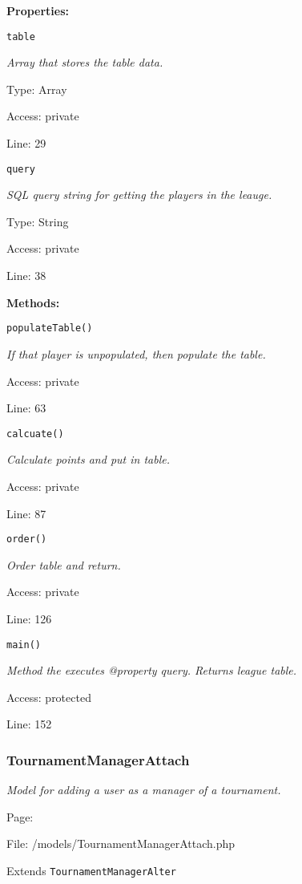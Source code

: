 \textbf{Properties:}

\texttt{table}

{\scriptsize
\textit{Array that stores the table data.}

Type: Array

Access: private

Line: 29

}
\texttt{query}

{\scriptsize
\textit{SQL query string for getting the players in the leauge.}

Type: String

Access: private

Line: 38

}
\textbf{Methods:}

\texttt{populateTable()}

{\scriptsize
\textit{If that player is unpopulated, then populate the table.}

Access: private

Line: 63

}

\texttt{calcuate()}

{\scriptsize
\textit{Calculate points and put in table.}

Access: private

Line: 87

}

\texttt{order()}

{\scriptsize
\textit{Order table and return.}

Access: private

Line: 126

}

\texttt{main()}

{\scriptsize
\textit{Method the executes @property query.
Returns league table.}

Access: protected

Line: 152

}

\subsubsection{TournamentManagerAttach}\label{TournamentManagerAttach.php.doc}
\textit{Model for adding a user as a manager of a tournament.}

Page: \pageref{TournamentManagerAttach.php}

File: /models/TournamentManagerAttach.php

Extends \texttt{TournamentManagerAlter}

